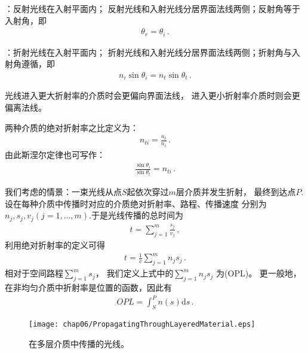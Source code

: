 \begin{proposition}
    ：反射光线在入射平面内；
    反射光线和入射光线分居界面法线两侧；反射角等于入射角，即
    \begin{align}
        \theta_r=\theta_i \, .
    \end{align}
\end{proposition}
\begin{proposition}
    ：折射光线在入射平面内；
    折射光线和入射光线分居界面法线两侧；折射角与入射角遵循，即
    \begin{align}
        n_i\sin\theta_i=n_t\sin\theta_t \, .
    \end{align}
\end{proposition}
\begin{corollary}
    光线进入更大折射率的介质时会更偏向界面法线，
    进入更小折射率介质时则会更偏离法线。
\end{corollary}
\begin{definition}
    两种介质的绝对折射率之比定义为：
    \begin{align}
        n_{ti}=\frac{n_t}{n_i}\, .
    \end{align}
    由此斯涅尔定律也可写作：
    \begin{align}
        \frac{\sin\theta_i}{\sin\theta_t}=n_{ti}\, .
    \end{align}
\end{definition}

我们考虑的情景：一束光线从点$S$起依次穿过$m$层介质并发生折射，
最终到达点$P$.设在每种介质中传播时对应的介质绝对折射率、路程、传播速度
分别为$n_j, s_j, v_j (j=1,\ldots,m)$.于是光线传播的总时间为
\begin{align}
    t=\sum\limits_{j=1}^{m}{\frac{s_j}{v_j}}\, ,
\end{align}
利用绝对折射率的定义可得
\begin{align}
    t=\frac{1}{c}\sum\limits_{j=1}^{m}{n_js_j}\, .
\end{align}
相对于空间路程$\sum\limits_{j=1}^{m}{s_j}$，
我们定义上式中的$\sum\limits_{j=1}^{m}{n_js_j}$
为(OPL)。
更一般地，在非均匀介质中折射率是位置的函数，因此有
\begin{align}
    OPL=\int_S^P {n(s)\mathrm{d}s}\, .
\end{align}
\begin{figure}[htbp]
    \centering\texttt{[image: chap06/PropagatingThroughLayeredMaterial.eps]}
    \caption{在多层介质中传播的光线。}
    \label{fig:6.27}
\end{figure}


